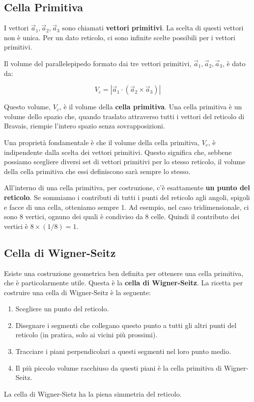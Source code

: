 \subsection*{Cella Primitiva}

I vettori $\vec{a}_1, \vec{a}_2, \vec{a}_3$ sono chiamati \textbf{vettori primitivi}. La scelta di questi vettori non è unica. Per un dato reticolo, ci sono infinite scelte possibili per i vettori primitivi.

Il volume del parallelepipedo formato dai tre vettori primitivi, $\vec{a}_1, \vec{a}_2, \vec{a}_3$, è dato da:

\begin{equation}
 V_c = |\vec{a}_1 \cdot (\vec{a}_2 \times \vec{a}_3)|
\end{equation}

Questo volume, $V_c$, è il volume della \textbf{cella primitiva}. Una cella primitiva è un volume dello spazio che, quando traslato attraverso tutti i vettori del reticolo di Bravais, riempie l'intero spazio senza sovrapposizioni.

Una proprietà fondamentale è che il volume della cella primitiva, $V_c$, è indipendente dalla scelta dei vettori primitivi. Questo significa che, sebbene possiamo scegliere diversi set di vettori primitivi per lo stesso reticolo, il volume della cella primitiva che essi definiscono sarà sempre lo stesso.

All'interno di una cella primitiva, per costruzione, c'è esattamente \textbf{un punto del reticolo}. Se sommiamo i contributi di tutti i punti del reticolo agli angoli, spigoli e facce di una cella, otteniamo sempre 1. Ad esempio, nel caso tridimensionale, ci sono 8 vertici, ognuno dei quali è condiviso da 8 celle. Quindi il contributo dei vertici è $8 \times (1/8) = 1$.

\subsection*{Cella di Wigner-Seitz}

Esiste una costruzione geometrica ben definita per ottenere una cella primitiva, che è particolarmente utile. Questa è la \textbf{cella di Wigner-Seitz}. La ricetta per costruire una cella di Wigner-Seitz è la seguente:
\begin{enumerate}
    \item Scegliere un punto del reticolo.
    \item Disegnare i segmenti che collegano questo punto a tutti gli altri punti del reticolo (in pratica, solo ai vicini più prossimi).
    \item Tracciare i piani perpendicolari a questi segmenti nel loro punto medio.
    \item Il più piccolo volume racchiuso da questi piani è la cella primitiva di Wigner-Seitz.
\end{enumerate}
La cella di Wigner-Sietz ha la piena simmetria del reticolo.


